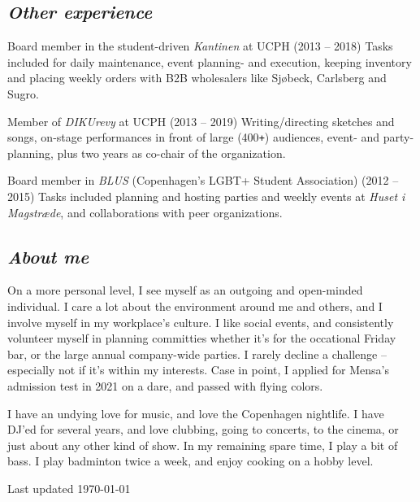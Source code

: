 \documentclass[10pt, a4paper]{article}
\begin{document}
\subsection*{\textit{Other experience}}
\begin{outline}
  \1 Board member in the student-driven \textit{Kantinen} at UCPH (2013 -- 2018)\newline
    {\footnotesize Tasks included for daily maintenance, event planning- and execution, keeping inventory and placing weekly orders with B2B wholesalers like Sjøbeck, Carlsberg and Sugro.}

  \1 Member of \textit{DIKUrevy} at UCPH (2013 -- 2019)\newline
    {\footnotesize Writing/directing sketches and songs, on-stage performances in front of large (400\texttt{+}) audiences, event- and party-planning, plus two years as co-chair of the organization.}

  \1 Board member in \textit{BLUS} (Copenhagen's LGBT+ Student Association)  (2012 -- 2015)\newline
    {\footnotesize Tasks included planning and hosting parties and weekly events at \textit{Huset i Magstræde}, and collaborations with peer organizations.}
\end{outline}
\vspace*{\fill}
\subsection*{\textit{About me}}
On a more personal level, I see myself as an outgoing and open-minded individual.
I care a lot about the environment around me and others, and I involve myself in my workplace's culture. I like social events, and consistently volunteer myself in planning committies whether it's for the occational Friday bar, or the large annual company-wide parties.
I rarely decline a challenge -- especially not if it's within my interests. Case in point, I applied for Mensa's admission test in 2021 on a dare, and passed with flying colors.

I have an undying love for music, and love the Copenhagen nightlife. I have DJ'ed for several years, and love clubbing, going to concerts, to the cinema, or just about any other kind of show.
In my remaining spare time, I play a bit of bass. I play badminton twice a week, and enjoy cooking on a hobby level.

\vspace*{\fill}
\begin{flushright}
  Last updated \today
\end{flushright}
\end{document}
